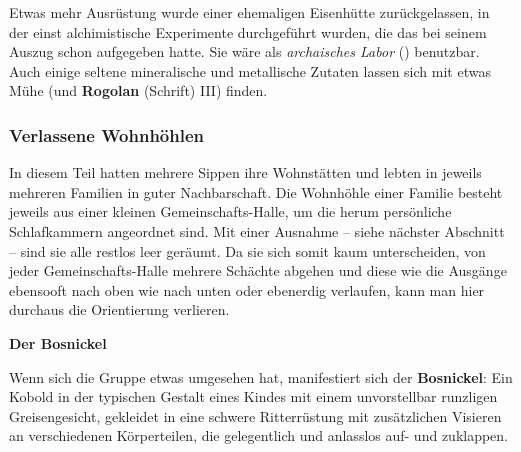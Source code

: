 Etwas mehr Ausrüstung wurde einer ehemaligen Eisenhütte zurückgelassen, in der einst alchimistische Experimente durchgeführt wurden, die das \fkv bei seinem Auszug schon aufgegeben hatte.
Sie wäre als \emph{archaisches Labor} () benutzbar.
Auch einige seltene mineralische und metallische Zutaten lassen sich mit etwas Mühe (und \textbf{Rogolan} (Schrift) III) finden.

\subsubsection{Verlassene Wohnhöhlen}
In diesem Teil hatten mehrere Sippen ihre Wohnstätten und lebten in jeweils mehreren Familien in guter Nachbarschaft.
Die Wohnhöhle einer Familie besteht jeweils aus einer kleinen Gemeinschafts-Halle, um die herum persönliche Schlafkammern angeordnet sind.
Mit einer Ausnahme -- siehe nächster Abschnitt -- sind sie alle restlos leer geräumt.
Da sie sich somit kaum unterscheiden, von jeder Gemeinschafts-Halle mehrere Schächte abgehen und diese wie die Ausgänge ebensooft nach oben wie nach unten oder ebenerdig verlaufen, kann man hier durchaus die Orientierung verlieren.

\neuespalte

\textbf{Der Bosnickel}


Wenn sich die Gruppe etwas umgesehen hat, manifestiert sich der \textbf{Bosnickel}:
Ein Kobold in der typischen Gestalt eines Kindes mit einem unvorstellbar runzligen Greisengesicht,
gekleidet in eine schwere Ritterrüstung mit zusätzlichen Visieren an verschiedenen Körperteilen,
die gelegentlich und anlasslos auf- und zuklappen.



